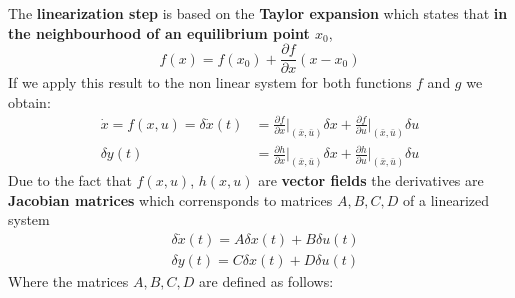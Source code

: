 The \textbf{linearization step} is based on the \textbf{Taylor expansion} which states that \textbf{in the neighbourhood of an equilibrium point $x_0 $}, $$ f(x) = f(x_0)+\frac{\partial f}{\partial x} (x-x_0)$$
If we apply this result to the non linear system for both functions $f$ and $g$ we obtain: 
\begin{align*}
    \dot{x}= f(x,u) =\delta \dot{x}(t) &= 
        \frac{\partial f}{\partial x} \Bigg|_{(\bar{x}, \bar{u})} \delta x +
        \frac{\partial f}{\partial u} \Bigg|_{(\bar{x}, \bar{u})} \delta u\\
    \delta y(t) &= \frac{\partial h}{\partial x} \Bigg|_{(\bar{x}, \bar{u})} \delta x +
    \frac{\partial h}{\partial u} \Bigg|_{(\bar{x}, \bar{u})} \delta u
\end{align*}
Due to the fact that $f(x,u)$, $h(x,u)$ are \textbf{vector fields} the derivatives are \textbf{Jacobian matrices} which corrensponds to matrices $A, B, C, D$ of a linearized system
\begin{align*}
    &\delta \dot{x}(t)=A\delta x(t) + B \delta u(t)\\
    &\delta y(t) = C \delta x(t) + D \delta u(t)
\end{align*}
Where the matrices $A, B, C, D$ are defined as follows:
